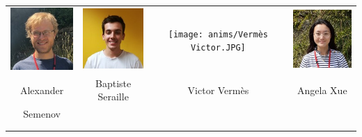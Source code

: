 \begin{center}
\begin{tabular}{cccc}
\includegraphics[angle=0,origin=c, width=27mm]{anims/Semenov Alexander.JPG} &
\includegraphics[angle=0,origin=c, width=27mm]{anims/Seraille Baptiste.jpg} &
\texttt{[image: anims/Vermès Victor.JPG]} &
\includegraphics[origin=c, width=27mm]{anims/Xue Angela.jpg} \\
Alexander & Baptiste Seraille & Victor Vermès & Angela Xue \\ Semenov & & \\ \\ \\ 

\end{tabular}
\end{center}